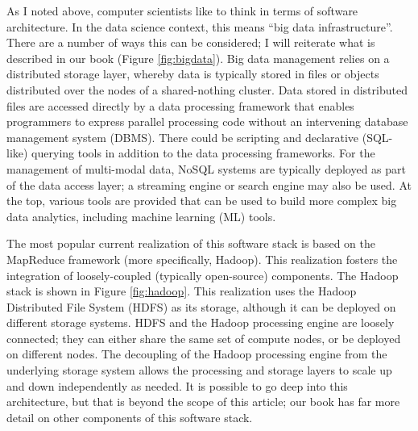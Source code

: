 \documentclass[11pt]{article}
\begin{document}
As I noted above, computer scientists like to think in terms of software architecture. In the data science context, this means ``big data infrastructure''. There are a number of ways this can be considered; I will reiterate what is described in our book \cite{OzsuV:2020aa} (Figure \ref{fig:bigdata}). Big data management relies on a distributed storage layer, whereby data is typically stored in files or objects distributed over the nodes of a shared-nothing cluster. Data stored in distributed files are accessed directly by a data processing framework that enables programmers to express parallel processing code without an intervening database management system (DBMS). There could be scripting and declarative (SQL-like) querying tools in addition to the data processing frameworks. For the management of multi-modal data, NoSQL systems are typically deployed as part of the data access layer; a streaming engine or search engine may also be used. At the top, various tools are provided that can be used to build more complex big data analytics, including machine learning (ML) tools.

The most popular current realization of this software stack is based on the MapReduce framework (more specifically, Hadoop). This realization fosters the integration of loosely-coupled (typically open-source) components. The Hadoop stack is shown in Figure \ref{fig:hadoop}. This realization uses the Hadoop Distributed File System (HDFS) as its storage, although it can be deployed on different storage systems. HDFS and the Hadoop processing engine
are loosely connected; they can either share the same set of compute nodes, or be deployed on different nodes. The decoupling of the Hadoop processing engine from the underlying storage system allows the processing and storage layers to scale up and down independently as needed. It is possible to go deep into this architecture, but that is beyond the scope of this article; our book has far more detail on other components of this software stack.
\end{document}
